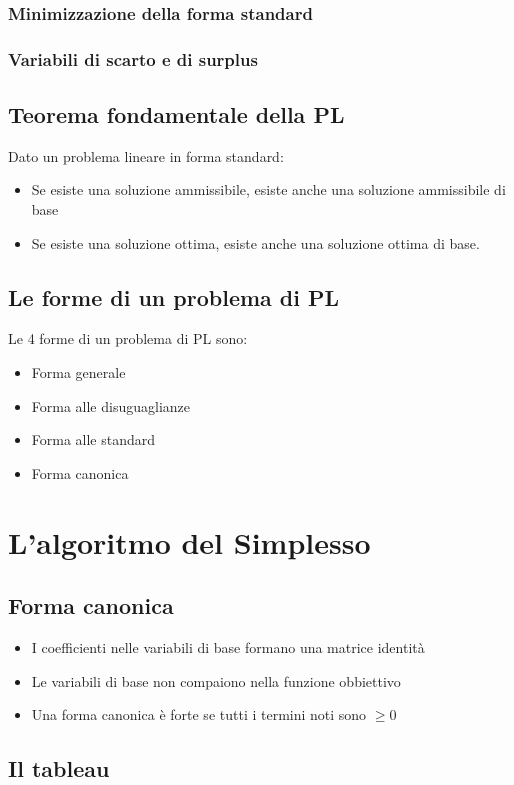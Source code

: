 \documentclass[11pt, oneside]{article}   	%
\begin{document}
\subsubsection{Minimizzazione della forma standard}
\subsubsection{Variabili di scarto e di surplus}
\subsection{Teorema fondamentale della PL}
Dato un problema lineare in forma standard:
\begin{itemize}
\item Se esiste una soluzione ammissibile, esiste anche una soluzione ammissibile di base
\item Se esiste una soluzione ottima, esiste anche una soluzione ottima di base.
\end{itemize}

\subsection*{Le forme di un problema di PL}
Le 4 forme di un problema di PL sono:
\begin{itemize}
\item Forma generale
\item Forma alle disuguaglianze
\item Forma alle standard
\item Forma canonica
\end{itemize}

\section{L'algoritmo del Simplesso}
\subsection{Forma canonica}
\begin{itemize}
\item I coefficienti nelle variabili di base formano una matrice identità
\item Le variabili di base non compaiono nella funzione obbiettivo
\item Una forma canonica è forte se tutti i termini noti sono $\geq 0$
\end{itemize}
\subsection{Il tableau}
\end{document}
